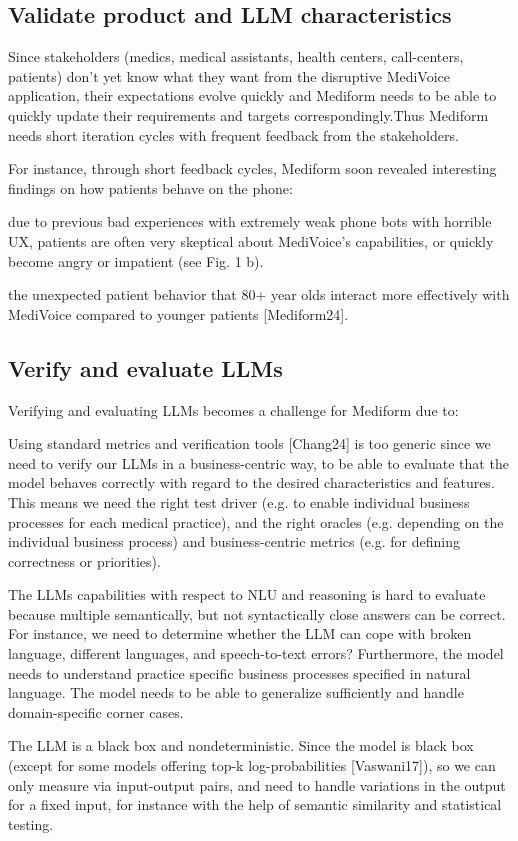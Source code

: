 \documentclass[twocolumn]{article}
\begin{document}
\subsection{Validate product and LLM characteristics}

Since stakeholders (medics, medical assistants, health centers, call-centers, patients) don’t yet know what they want from the disruptive MediVoice application, their expectations evolve quickly and Mediform needs to be able to quickly update their requirements and targets correspondingly.Thus Mediform needs short iteration cycles with frequent feedback from the stakeholders. 

For instance, through short feedback cycles, Mediform soon revealed interesting findings on how patients behave on the phone:
\begin{compactitem}
\item due to previous bad experiences with extremely weak phone bots with horrible UX, patients are often very skeptical about MediVoice’s capabilities, or quickly become angry or impatient  (see Fig. 1 b). 
\item the unexpected patient behavior that 80+ year olds interact more effectively with MediVoice compared to younger patients [Mediform24].
\end{compactitem}

\subsection{Verify and evaluate LLMs}

Verifying and evaluating LLMs becomes a challenge for Mediform due to:
\begin{compactitem}
\item Using standard metrics and verification tools [Chang24] is too generic since we need to verify our LLMs in a business-centric way, to be able to evaluate that the model behaves correctly with regard to the desired characteristics and features. This means we need the right test driver (e.g. to enable individual business processes for each medical practice), and the right oracles (e.g. depending on the individual business process) and business-centric metrics (e.g. for defining correctness or priorities).
\item The LLMs capabilities with respect to NLU and reasoning is hard to evaluate because multiple semantically, but not syntactically close answers can be correct. For instance, we need to determine whether the LLM can cope with broken language, different languages, and speech-to-text errors? Furthermore, the model needs to understand practice specific business processes specified in natural language. The model needs to be able to generalize sufficiently and handle domain-specific corner cases.
\item The LLM is a black box and nondeterministic. Since the model is black box (except for some models offering top-k log-probabilities [Vaswani17]), so we can only measure via input-output pairs, and need to handle variations in the output for a fixed input, for instance with the help of semantic similarity and statistical testing.
\end{compactitem}
\end{document}
